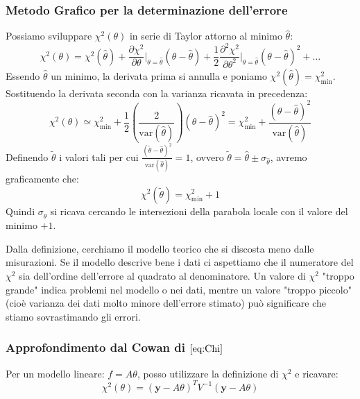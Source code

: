\documentclass[openany,a4paper,12pt]{book}
\theoremstyle{remark}
\begin{document}
\subsubsection*{Metodo Grafico per la determinazione dell'errore}
Possiamo sviluppare $\chi^2(\theta)$ in serie di Taylor attorno al minimo $\hat{\theta}$:
\begin{equation}
    \chi^2(\theta) = \chi^2(\hat{\theta}) + \frac{\partial \chi^2}{\partial \theta}\bigg|_{\theta = \hat{\theta}} (\theta - \hat{\theta}) + \frac{1}{2} \frac{\partial^2 \chi^2}{\partial \theta^2}\bigg|_{\theta = \hat{\theta}} (\theta - \hat{\theta})^2 + \dots
\end{equation}
Essendo $\hat{\theta}$ un minimo, la derivata prima si annulla e poniamo $\chi^2(\hat{\theta}) = \chi^2_{\min}$. Sostituendo la derivata seconda con la varianza ricavata in precedenza:
\begin{equation}
    \chi^2(\theta) \simeq \chi^2_{\min} + \frac{1}{2} \left( \frac{2}{\text{var}(\hat{\theta})} \right) (\theta - \hat{\theta})^2 = \chi^2_{\min} + \frac{(\theta - \hat{\theta})^2}{\text{var}(\hat{\theta})}
\end{equation}
Definendo $\tilde{\theta}$ i valori tali per cui $\frac{(\tilde{\theta} - \hat{\theta})^2}{\text{var}(\hat{\theta})} = 1$, ovvero $\tilde{\theta} = \hat{\theta} \pm \sigma_{\hat{\theta}}$, avremo graficamente che:
\begin{equation}
    \chi^2(\tilde{\theta}) = \chi^2_{\min} + 1
    \label{eq:Chi}
\end{equation}
Quindi $\sigma_{\hat{\theta}}$ si ricava cercando le intersezioni della parabola locale con il valore del minimo $+1$.

\begin{nota}
    Dalla definizione, cerchiamo il modello teorico che si discosta meno dalle misurazioni. Se il modello descrive bene i dati ci aspettiamo che il numeratore del $\chi^2$ sia dell'ordine dell'errore al quadrato al denominatore. Un valore di $\chi^2$ "troppo grande" indica problemi nel modello o nei dati, mentre un valore "troppo piccolo" (cioè varianza dei dati molto minore dell'errore stimato) può significare che stiamo sovrastimando gli errori.
\end{nota}

\subsubsection*{Approfondimento dal Cowan di $\eqref{eq:Chi}$}
Per un modello lineare: $f=A\theta$, posso utilizzare la definizione di $\chi^2$ e ricavare:
\begin{equation*}
\chi^2(\theta) = (\mathbf{y} - A\theta)^T V^{-1} (\mathbf{y} - A\theta)
\end{equation*}
\end{document}
